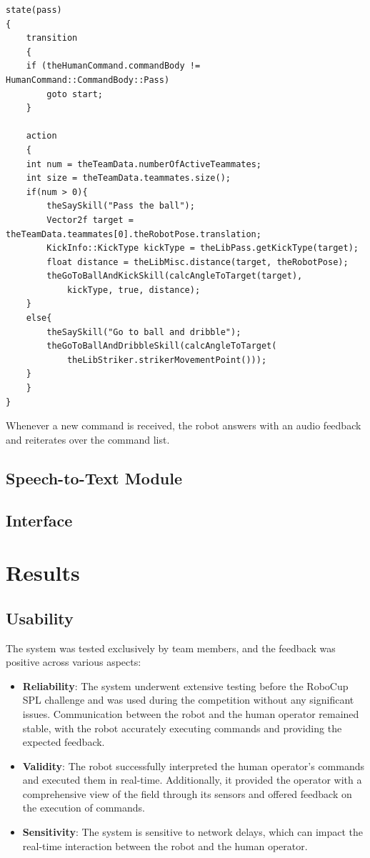 \documentclass[a4paper, onecolumn, 12pt]{article}
\begin{document}
\begin{verbatim}
state(pass)
{
    transition
    {
    if (theHumanCommand.commandBody != HumanCommand::CommandBody::Pass)
        goto start;
    }

    action
    {
    int num = theTeamData.numberOfActiveTeammates;
    int size = theTeamData.teammates.size();
    if(num > 0){
        theSaySkill("Pass the ball");
        Vector2f target = theTeamData.teammates[0].theRobotPose.translation;
        KickInfo::KickType kickType = theLibPass.getKickType(target);
        float distance = theLibMisc.distance(target, theRobotPose);
        theGoToBallAndKickSkill(calcAngleToTarget(target), 
            kickType, true, distance);
    }
    else{
        theSaySkill("Go to ball and dribble");
        theGoToBallAndDribbleSkill(calcAngleToTarget(
            theLibStriker.strikerMovementPoint()));
    }
    }
}
\end{verbatim}

Whenever a new command is received, the robot answers with an audio feedback and
reiterates over the command list. 



\subsection{Speech-to-Text Module}


\subsection{Interface}


\section{Results}
\label{sec:res}
\subsection{Usability}  
The system was tested exclusively by team members, and the feedback was positive 
across various aspects:  
\begin{itemize}  
    \item \textbf{Reliability}: The system underwent extensive testing before the RoboCup 
    SPL challenge and was used during the competition without any significant issues. 
    Communication between the robot and the human operator remained stable, with the 
    robot accurately executing commands and providing the expected feedback.  
    \item \textbf{Validity}: The robot successfully interpreted the human operator's 
    commands and executed them in real-time. Additionally, it provided the operator with a comprehensive view of the field through its sensors and offered feedback on the execution of commands.  
    \item \textbf{Sensitivity}: The system is sensitive to network delays, which can 
    impact the real-time interaction between the robot and the human operator.  
\end{itemize}  
\end{document}
